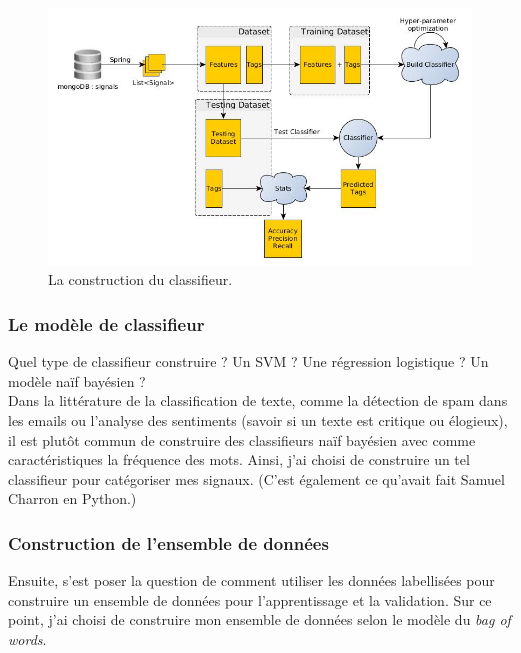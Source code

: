             \begin{figure}[h!]
                \centering
                \includegraphics[width=\textwidth]{images/classifier_building.jpg}
                \caption{La construction du classifieur.}
                \label{fig:classif_building}
            \end{figure}

            \subsubsection{Le modèle de classifieur}
                Quel type de classifieur construire ? Un SVM ? Une régression logistique ? Un modèle naïf bayésien ?\\
                Dans la littérature de la classification de texte, comme la détection de spam dans les emails ou l'analyse des sentiments (savoir si un texte est critique ou élogieux), il est plutôt commun de construire des classifieurs naïf bayésien avec comme caractéristiques la fréquence des mots. Ainsi, j'ai choisi de construire un tel classifieur pour catégoriser mes signaux. (C'est également ce qu'avait fait Samuel Charron en Python.)

            \subsubsection{Construction de l'ensemble de données}
                Ensuite, s'est poser la question de comment utiliser les données labellisées pour construire un ensemble de données pour l'apprentissage et la validation. Sur ce point, j'ai choisi de construire mon ensemble de données selon le modèle du \textit{bag of words}.\\


